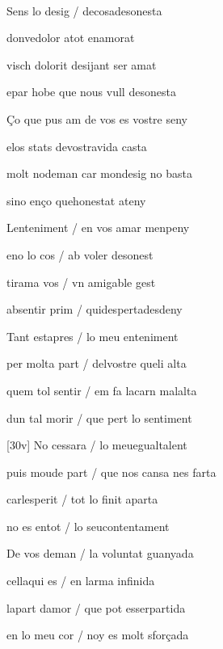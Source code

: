 \documentclass[12pt]{article}
\renewcommand{\espaiAbansEtiquetaPoema}{\vspace{0ex}}
\begin{document}
\begin{estrofa}

\espaiAbansEtiquetaPoema

\\

\end{estrofa}


\begin{estrofa}

 Sens lo desig / decosadesonesta

 donvedolor atot enamorat

 visch dolorit desijant ser amat

 epar hobe que nous vull desonesta

 \c{C}o que pus am de vos es vostre seny

 elos stats devostravida casta

 molt nodeman car mondesig no basta

 sino en\c{c}o quehonestat ateny

\end{estrofa}



\begin{estrofa}

 Lenteniment / en vos amar menpeny

 eno lo cos / ab voler desonest

 tirama vos / vn amigable gest

 absentir prim / quidespertadesdeny

 Tant estapres / lo meu enteniment

 per molta part / delvostre queli alta

 quem tol sentir / em fa lacarn malalta

 dun tal morir / que pert lo sentiment

\end{estrofa}



\begin{estrofa}

 [30v] No cessara / lo meuegualtalent

 puis moude part / que nos cansa nes farta

 carlesperit / tot lo finit aparta

 no es entot / lo seucontentament

 De vos deman / la voluntat guanyada

 cellaqui es / en larma infinida

 lapart damor / que pot esserpartida

 en lo meu cor / noy es molt sfor\c{c}ada

\end{estrofa}
\end{document}
